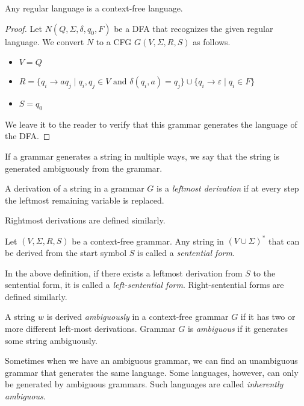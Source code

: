 \begin{lemma}
Any regular language is a context-free language.
\end{lemma}
\begin{proof}
Let $N(Q,\Sigma,\delta,q_0,F)$ be a DFA that recognizes the given regular language. We convert $N$ to a CFG $G(V,\Sigma,R,S)$ as follows.
\begin{itemize}
    \item $V=Q$
    \item $R=\{q_i\to aq_j\mid q_i,q_j\in V \text{ and } \delta(q_i,a)=q_j\} \cup\{q_i\to\varepsilon\mid q_i\in F\}$
    \item $S=q_0$
\end{itemize}
We leave it to the reader to verify that this grammar generates the language of the DFA.
\end{proof}

If a grammar generates a string in multiple ways, we say that the string is generated ambiguously from the grammar.
\begin{definition}
A derivation of a string in a grammar $G$ is a \textit{leftmost derivation} if at every step the leftmost remaining variable is replaced.
\end{definition}

Rightmost derivations are defined similarly.

\begin{definition}
Let $(V,\Sigma,R,S)$ be a context-free grammar. Any string in $(V\cup\Sigma)^*$ that can be derived from the start symbol $S$ is called a \textit{sentential form}.
\end{definition}

In the above definition, if there exists a leftmost derivation from $S$ to the sentential form, it is called a \textit{left-sentential form}. Right-sentential forms are defined similarly.

\begin{definition}
A string $w$ is derived \textit{ambiguously} in a context-free grammar $G$ if it has two or more different left-most derivations. Grammar $G$ is \textit{ambiguous} if it generates some string ambiguously.
\end{definition}

Sometimes when we have an ambiguous grammar, we can find an unambiguous grammar that generates the same language. Some languages, however, can only be generated by ambiguous grammars. Such languages are called \textit{inherently ambiguous}.

